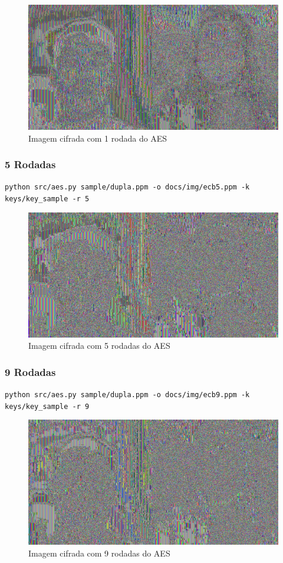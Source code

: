 \documentclass[12pt]{article}
\begin{document}
\begin{figure}[H]
	\centering
    \includegraphics[width=.5\textwidth]{img/ecb1.jpg}
    \caption{Imagem cifrada com 1 rodada do AES}
\end{figure}

\subsubsection{5 Rodadas}

\texttt{python src/aes.py sample/dupla.ppm -o docs/img/ecb5.ppm -k keys/key\_sample -r 5}

\begin{figure}[H]
	\centering
    \includegraphics[width=.5\textwidth]{img/ecb5.jpg}
    \caption{Imagem cifrada com 5 rodadas do AES}
\end{figure}

\subsubsection{9 Rodadas}

\texttt{python src/aes.py sample/dupla.ppm -o docs/img/ecb9.ppm -k keys/key\_sample -r 9}

\begin{figure}[H]
	\centering
    \includegraphics[width=.5\textwidth]{img/ecb9.jpg}
    \caption{Imagem cifrada com 9 rodadas do AES}
\end{figure}
\end{document}
